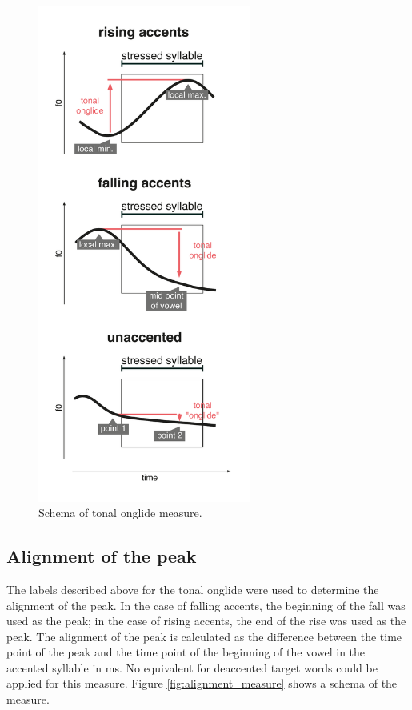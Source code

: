 \begin{figure}
\includegraphics[width=7cm]{figures/ch5/measures_onglide.pdf}
\caption{Schema of tonal onglide measure.}
\label{fig:onglide_measure}
\end{figure}

\subsection{Alignment of the peak}

The labels described above for the tonal onglide were used to determine the alignment of the peak. In the case of falling accents, the beginning of the fall was used as the peak; in the case of rising accents, the end of the rise was used as the peak. The alignment of the peak is calculated as the difference between the time point of the peak and the time point of the beginning of the vowel in the accented syllable in ms. No equivalent for deaccented target words could be applied for this measure. Figure \ref{fig:alignment_measure} shows a schema of the measure.


